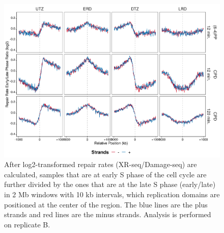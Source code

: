 \begin{figure}[H]
\begin{center}
\includegraphics[width=\textwidth]{Chapters/7_appendix/figures/supfig29}
\caption[Repair rate early/late phase ratio of replication domains in 2 Mb (replicate B).]{After log2-transformed repair rates (XR-seq/Damage-seq) are calculated, samples that are at early S phase of the cell cycle are further divided by the ones that are at the late S phase (early/late) in 2 Mb windows with 10 kb intervals, which replication domains are positioned at the center of the region. The blue lines are the plus strands and red lines are the minus strands. Analysis is performed on replicate B.}
\label{supfig:rrel2000repdomainB}
\end{center}
\end{figure}

